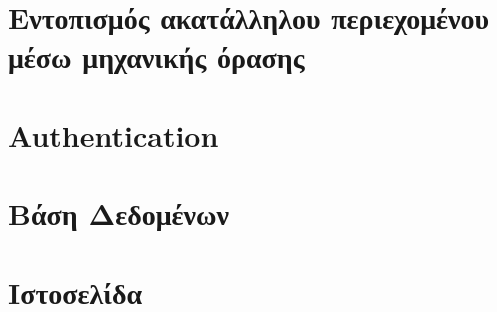 \documentclass[../thesis.tex]{subfiles}
\begin{document}
\chapter{Εντοπισμός ακατάλληλου περιεχομένου μέσω μηχανικής όρασης}
\label{sec:ml}


\chapter{Authentication}
\label{sec:authentication}


\chapter{Βάση Δεδομένων}
\label{sec:mysql}


\chapter{Ιστοσελίδα}
\label{sec:website}

\end{document}
